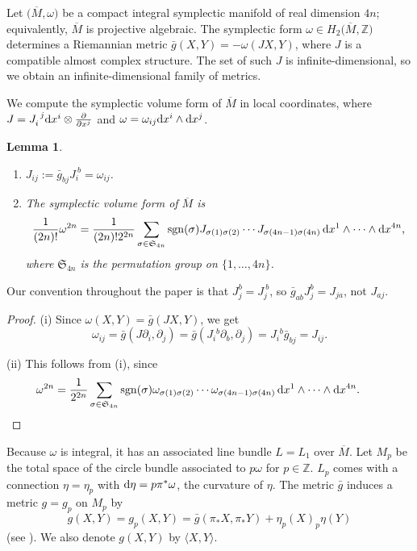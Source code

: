 \documentclass[10pt,a4paper]{amsart}
\numberwithin{equation}{section}
\newtheorem{Lemma}[Theorem]{Lemma}
\theoremstyle{definition}
\newcommand{\BbZ}{{\mathbb Z}}
\newcommand{\Z}{\BbZ}
\newcommand{\be}{\eta}
\newcommand{\bgg}{\bar g}
\newcommand{\bg}{ g}
\newcommand{\bx}{X}
\newcommand{\by}{Y}
\newcommand{\sgn}{{\rm sgn}}
\newcommand{\om}{\overline{M}}
\newcommand{\omp}{M_p}
\begin{document}
Let $\bigl(\om,\omega\bigr)$ be a compact integral symplectic manifold of real dimension $4n$;
equivalently, $\om$ is projective algebraic. The symplectic form $\omega\in H_2\bigl(\om,\Z\bigr)$ determines a Riemannian metric $\bar g(X,Y) = -\omega(JX,Y)$, where $J$ is a compatible almost complex structure. The set of such $J$ is infinite-dimensional, so we obtain an infinite-dimensional family of metrics.

We compute the symplectic volume form of $\om$ in local coordinates, where
 $J = J_{ i}^{\ j} {\rm d}x^i \otimes \frac{\partial}{\partial x^j}$
 and $\omega = \omega_{ij} {\rm d}x^i\wedge {\rm d}x^j$.

 \begin{Lemma} \label{lem:Y.one}\quad
 \begin{enumerate}\itemsep=0pt
\item[$(i)$] $J_{ij} := \bgg_{bj}J^{\ b}_{ i} = \omega_{ij}$.

\item[$(ii)$]
The symplectic volume form of $\om$ is
\[\frac{1}{(2n)!}\omega^{2n} = \frac{1}{(2n)!2^{2n}}\sum_{\sigma\in \mathfrak S_{4n}}\sgn (\sigma) J_{\sigma(1)\sigma(2)} \cdots
 J_{\sigma(4n-1)\sigma(4n)}\, {\rm d}x^1\wedge\cdots\wedge {\rm d}x^{4n},\]
where $\mathfrak S_{4n}$ is the permutation group on $\{1,\dots,4n\}$.
\end{enumerate}
\end{Lemma}

Our convention throughout the paper is that $J_j^b = J_j^{\ b}$, so $\bgg_{ab}J_j^b = J_{ja}$, not $J_{aj}$.

\begin{proof} (i) Since $\omega(X,Y) = \bgg(JX,Y)$, we get
\[\omega_{ij} = \bgg(J\partial_i, \partial_j) = \bgg(J_i{}^b\partial_b, \partial_j) = J_i{}^b \bgg_{bj} = J_{ij}.\]

(ii) This follows from (i), since
\[\omega^{2n} =\frac{1}{2^{2n}}
\sum_{\sigma\in \mathfrak S_{4n}}\sgn (\sigma) \omega_{\sigma(1)\sigma(2)} \cdots
 \omega_{\sigma(4n-1)\sigma(4n)}\, {\rm d}x^1\wedge\cdots\wedge {\rm d}x^{4n}.\tag*{\qed}\]
\renewcommand{\qed}{}
\end{proof}

Because $\omega$ is integral, it has an associated line bundle $L = L_1$ over $\om$. Let $\omp$ be the total space of the circle bundle \smash{$L_p\stackrel{\pi}{\to} \om$} associated to $p\omega$ for $p\in\Z$.
$L_p$ comes with a connection $\eta= \eta_p$ with ${\rm d}\eta = p\pi^*\omega$, the curvature of $\eta$. The metric $\bgg$ induces a metric $g=g_p$ on $\omp$ by
\begin{equation}\label{eq:gp}\bg(\bx,\by)= \bg_p(X,Y) = \bar g(\pi_*\bx, \pi_*\by) + \be_p(\bx)_p\be(\by)
\end{equation}
(see \cite[p.~37]{Blair}).
We also denote $\bg(\bx,\by)$ by $\langle \bx, \by\rangle$.
\end{document}
